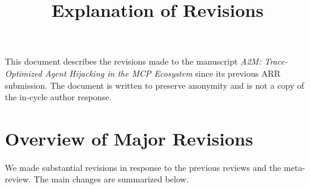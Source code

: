 \documentclass[11pt]{article}
\title{\vspace{-2em}Explanation of Revisions}
\author{}
\date{}
\begin{document}
\maketitle
\vspace{-3em}

This document describes the revisions made to the manuscript
\emph{A2M: Trace-Optimized Agent Hijacking in the MCP Ecosystem}
since its previous ARR submission.
The document is written to preserve anonymity
and is not a copy of the in-cycle author response.

\section{Overview of Major Revisions}

We made substantial revisions in response to the previous reviews
and the meta-review.
The main changes are summarized below.
\end{document}
